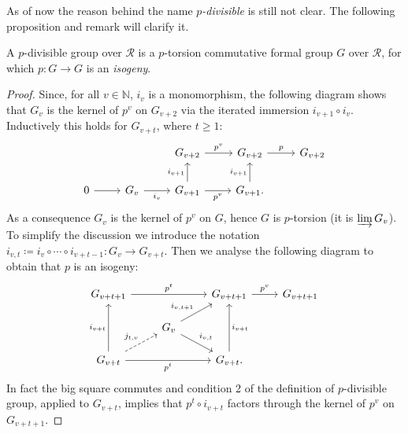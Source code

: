 \noindent
As of now the reason behind the name \emph{\(p\)-divisible} is still not clear.
The following proposition and remark will clarify it.
\newpage
\begin{prop}\label{CharactpDivGroups}%
	A $p$-divisible group over $\mathscr{R}$ is a $p$-torsion
	commutative formal group $G$ over $\mathscr{R}$,
	for which $p\colon G \to G$ is an \emph{isogeny}.
\end{prop}
\begin{proof}
	Since, for all \(v \in \mathbb{N}\), \(i_v\) is a monomorphism,
	the following diagram shows that $G_v$ is the kernel of $p^v$
	on $G_{v+2}$ via the iterated immersion $i_{v+1} \circ i_v$.
	Inductively this holds for $G_{v+t}$, where $t \geq 1$:
	\begin{equation*}
	\begin{tikzcd}
		&
		&
		G_{v+2} \arrow[r, "p^v", rightarrow] &
		G_{v+2} \arrow[r, "p", rightarrow] &
		G_{v+2}\\
		0 \arrow[r, "", rightarrow] &
		G_{v} \arrow[r, "i_v"', rightarrow] &
		G_{v+1} \arrow[r, "p^v"', rightarrow] 
		\arrow[u, "i_{v+1}", rightarrow] &
		G_{v+1}. \arrow[u, "i_{v+1}", rightarrow] &
	\end{tikzcd}
	\end{equation*}
	As a consequence $G_v$ is the kernel of $p^v$ on $G$,
	hence $G$ is $p$-torsion (it is $\varinjlim G_v$).
	To simplify the discussion we introduce the notation
	$i_{v,t} \coloneqq i_v \circ \cdots \circ i_{v+t-1}\colon G_v \to G_{v + t}$.
	Then we analyse the following diagram to obtain that $p$
	is an isogeny:
	\begin{equation}\label{diag:pDivCharProof}
	\begin{tikzcd}[row sep=1.4em]
		G_{v+t+1} \arrow[rr, "p^t", rightarrow] & &
		G_{v+t+1} \arrow[r, "p^v", rightarrow] &
		G_{v+t+1}\\
		&
		G_v \arrow[ru, "i_{v,t+1}", rightarrow] 
		\arrow[rd, "i_{v,t}", rightarrow] 
		& & \\
		G_{v+t} \arrow[ru, "j_{t,v}", dashrightarrow] 
		\arrow[rr, "p^t"', rightarrow]
		\arrow[uu, "i_{v+t}", rightarrow] & &
		G_{v+t} \arrow[uu, "i_{v+t}"', rightarrow]
	.\end{tikzcd}
	\end{equation}
	In fact the big square commutes and condition 2 of the definition
	of $p$-divisible group, applied to $G_{v+t}$, implies that $p^t \circ i_{v+t}$
	factors through the kernel of $p^v$ on $G_{v+t+1}$.

\end{proof}
